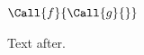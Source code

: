 \documentclass{article}
\begin{document}
\begin{algorithmic}
\State $\Call{f}{\Call{g}{}}$
\State {}
\EndProcedure
\end{algorithmic}
Text after.
\end{document}
